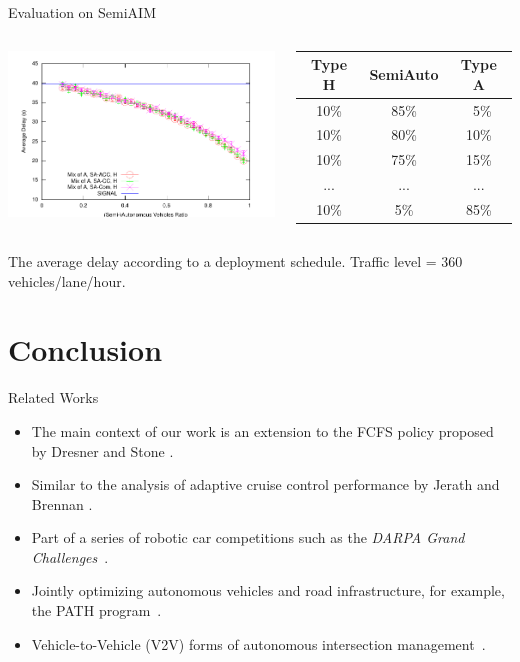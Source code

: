 \documentclass{beamer}
\begin{document}
\begin{frame}{Evaluation on SemiAIM}
\begin{columns}[c]
	\includegraphics[width=\columnwidth]{figures/figure_4.pdf}

	\small
	\begin{tabular}{|c|c|c|}
    \hline
     Type H&  SemiAuto &    Type A\\
    \hline
     10\%&     85\%&   \ 5\% \\
    \hline
     10\%&     80\%&  10\% \\
    \hline
     10\%&     75\%&  15\% \\
    \hline
      ...&  ... &  ...\\
    \hline
     10\%&       5\%&  85\% \\
    \hline
	\end{tabular}
\end{columns}

\hfill

The average delay according to a deployment schedule. Traffic level =
360 vehicles/lane/hour.
\end{frame}


\section{Conclusion}

\begin{frame}{Related Works}
\begin{itemize}
\item The main context of our work is an extension to the FCFS policy
proposed by Dresner and Stone \cite{bib:Dresner08Multiagent}.
\item Similar to the analysis of adaptive cruise control performance
by Jerath and Brennan \cite{bib:Jerath10adaptive}.
\item Part of a series of robotic car competitions such as the
\emph{DARPA Grand Challenges}~\cite{DARPAGrandChallenge}.
\item Jointly optimizing
autonomous vehicles and road infrastructure, for example, the PATH
program~\cite{bib:Shladover91Automated}.
\item Vehicle-to-Vehicle (V2V) forms of autonomous intersection
management~\cite{naumann97:intersection, ATT08-vanmiddlesworth}.
\end{itemize}
\end{frame}
\end{document}
